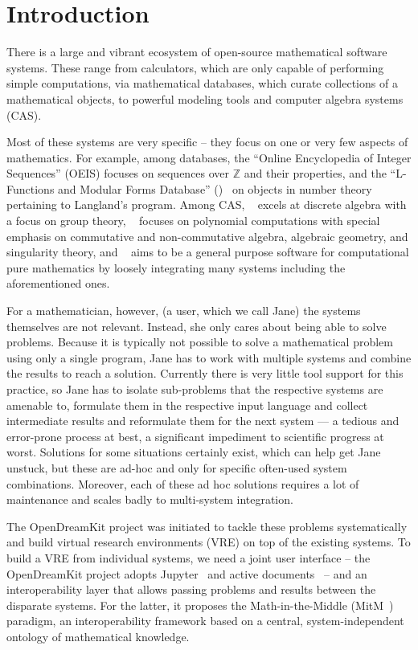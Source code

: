 \section{Introduction}\label{sec:intro}

There is a large and vibrant ecosystem of open-source mathematical software systems. 
These range from calculators, which are only capable of performing simple computations, via mathematical databases, which curate collections of a mathematical objects, to powerful modeling tools and computer algebra systems (CAS).

Most of these systems are very specific -- they focus on one or very few aspects of mathematics.
For example, among databases, the ``Online Encyclopedia of Integer Sequences'' (OEIS) focuses
on sequences over $\mathbb{Z}$ and their properties, and the ``L-Functions and Modular Forms
Database'' (\LMFDB)~\cite{Cremona:LMFDB16,lmfdb:on} on objects in number theory pertaining to
Langland's program. Among CAS, \GAP~\cite{GAP:on} excels at discrete algebra with a focus on group theory,
\Singular~\cite{singular:on} focuses on polynomial computations with special emphasis on
commutative and non-commutative algebra, algebraic geometry, and singularity theory, and
\Sage~\cite{SageMath:on} aims to be a general purpose software for computational pure
mathematics by loosely integrating many systems including the aforementioned ones.

For a mathematician, however, (a user, which we call Jane) the systems themselves are not relevant.
Instead, she only cares about being able to solve problems. 
Because it is typically not possible to solve a mathematical problem using only a single program, Jane has to work with multiple systems and combine the results to reach a solution. 
Currently there is very little tool support for this practice, so Jane has to isolate sub-problems that the respective systems are amenable to, formulate them in the respective input language and collect intermediate results and reformulate them for the next system --- a tedious and error-prone process at best, a significant impediment to scientific progress at worst.
Solutions for some situations certainly exist, which can help get Jane unstuck, but these are ad-hoc and only for specific often-used system combinations. 
Moreover, each of these ad hoc solutions requires a lot of maintenance and scales badly to multi-system integration. 

The OpenDreamKit project was initiated to tackle these problems systematically and build virtual research environments (VRE) on top of the existing systems.
To build a VRE from individual systems, we need a joint user interface -- the OpenDreamKit project adopts Jupyter~\cite{jupyter-project:on} and active
documents~\cite{KohDavGin:psewads11} -- and an interoperability layer that allows passing problems and results between the disparate systems. 
For the latter, it proposes the Math-in-the-Middle (MitM~\cite{DehKohKon:iop16}) paradigm, an interoperability framework based on a central, system-independent ontology of mathematical knowledge.


